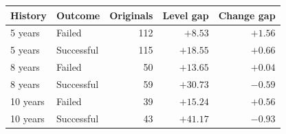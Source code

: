 \begin{tabular}{llrrr}
\toprule
History & Outcome & Originals & Level gap & Change gap \\
\midrule
5 years & Failed & 112 & $+8.53$ & $+1.56$ \\
5 years & Successful & 115 & $+18.55$ & $+0.66$ \\
8 years & Failed & 50 & $+13.65$ & $+0.04$ \\
8 years & Successful & 59 & $+30.73$ & $-0.59$ \\
10 years & Failed & 39 & $+15.24$ & $+0.56$ \\
10 years & Successful & 43 & $+41.17$ & $-0.93$ \\
\bottomrule
\end{tabular}
